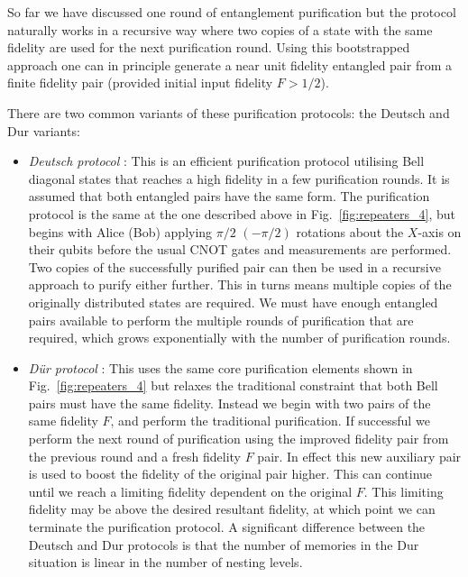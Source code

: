 So far we have discussed one round of entanglement purification but the protocol naturally works in a recursive way where two copies of a state with the same fidelity are used for the next purification round. Using this bootstrapped approach one can in principle generate a near unit fidelity entangled pair from a finite fidelity pair (provided initial input fidelity \mbox{$F>1/2$}). 

There are two common variants of these purification protocols: the Deutsch and Dur variants:
\begin{itemize}
\item \textit{Deutsch protocol} \cite{bib:Deutsch98}: This is an efficient purification protocol utilising Bell diagonal states that reaches a high fidelity in a few purification rounds. It is assumed that both entangled pairs have the same form. The purification protocol is the same at the one described above in Fig.~\ref{fig:repeaters_4}, but begins with Alice (Bob) applying $\pi/2$ $(-\pi/2)$ rotations about the $X$-axis on their qubits before the usual CNOT gates and measurements are performed. Two copies of the successfully purified pair can then be used in a recursive approach to purify either further. This in turns means multiple copies of the originally distributed states are required. We must have enough entangled pairs available to perform the multiple rounds of purification that are required, which grows exponentially with the number of purification rounds. 

\item \textit{D{\"u}r protocol} \cite{bib:dur98}: This uses the same core purification elements shown in Fig.~\ref{fig:repeaters_4} but relaxes the traditional constraint that both Bell pairs must have the same fidelity. Instead we begin with two pairs of the same fidelity $F$, and perform the traditional purification. If successful we perform the next round of purification using the improved fidelity pair from the previous round and a fresh fidelity $F$ pair. In effect this new auxiliary pair is used to boost the fidelity of the original pair higher. This can continue until we reach a limiting fidelity dependent on the original $F$. This limiting fidelity may be above the desired resultant fidelity, at which point we can terminate the purification protocol. A significant difference between the Deutsch and Dur protocols is that the number of memories in the Dur situation is linear in the number of nesting levels.
\end{itemize}


